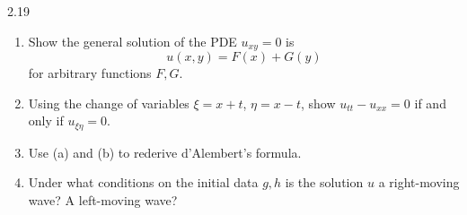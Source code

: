 \documentclass{article}
\begin{document}
\begin{prb}{2.19}
$ $\newline \vspace{-0.25cm}
\begin{enumerate}[itemsep =-2pt,label = (\alph{*})]
	\item Show the general solution of the PDE $u_{xy} = 0$ is 
	\begin{equation*}
		u(x, y) = F(x) + G(y) 
	\end{equation*}
	for arbitrary functions $F, G$. 
	\item Using the change of variables $\xi = x + t$, $\eta = x - t$, show $u_{tt} - u_{xx} = 0$ if and only if $u_{\xi\eta} = 0$. 
	\item Use (a) and (b) to rederive d'Alembert's formula. 
	\item Under what conditions on the initial data $g, h$ is the solution $u$ a right-moving wave? A left-moving wave? 
\end{enumerate}
\end{prb}
\end{document}
